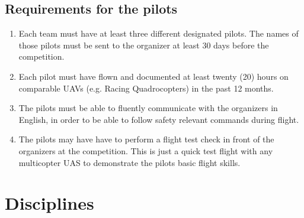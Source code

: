     \subsection{Requirements for the pilots}\label{pilotrequirements}
    \begin{enumerate}
      \item Each team must have at least three different designated pilots. The names of those pilots must be sent to the organizer at least 
      30 days before the competition. 
      \item Each pilot must have flown and documented at least twenty (20) hours on comparable UAVs (e.g. Racing Quadrocopters) in the past 12 months.  
      \item The pilots must be able to fluently communicate with the organizers in English, in order to be able to follow safety relevant commands during flight.
      \item The pilots may have have to perform a flight test check in front of the organizers at the competition. This is just a quick test flight with any multicopter UAS to demonstrate the pilots basic flight skills.
    \end{enumerate}




    \section{Disciplines}
